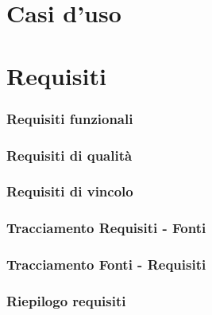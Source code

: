 %
%
%

\section{Casi d'uso}

\newpage
\section{Requisiti}
\subsubsection{Requisiti funzionali}

\newpage
\subsubsection{Requisiti di qualità}

\newpage
\subsubsection{Requisiti di vincolo}

\newpage
\subsubsection{Tracciamento Requisiti - Fonti}

\newpage
\subsubsection{Tracciamento Fonti - Requisiti}

\newpage
\subsubsection{Riepilogo requisiti}

\newpage
